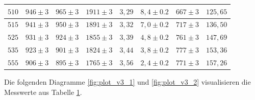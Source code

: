 \begin{table}[H]
\begin{tabular}{|l|l|l|l|l|l|l|l|}
                    \hline
                    $510$ & $946 \pm 3$ & $965 \pm 3$ & $1911 \pm 3$ & $3,29$ & $8,4 \pm 0.2$ & $667 \pm 3$ & $125,65$\\
                    \hline
                    $515$ & $941 \pm 3$ & $950 \pm 3$ & $1891 \pm 3$ & $3,32$ & $7,0 \pm 0.2$ & $717 \pm 3$ & $136,50$\\
                    \hline
                    $525$ & $931 \pm 3$ & $924 \pm 3$ & $1855 \pm 3$ & $3,39$ & $4,8 \pm 0.2$ & $761 \pm 3$ & $147,69$\\
                    \hline
                    $535$ & $923 \pm 3$ & $901 \pm 3$ & $1824 \pm 3$ & $3,44$ & $3,8 \pm 0.2$ & $777 \pm 3$ & $153,36$\\
                    \hline
                    $555$ & $906 \pm 3$ & $895 \pm 3$ & $1765 \pm 3$ & $3,56$ & $2,4 \pm 0.2$ & $771 \pm 3$ & $157,26$\\
                    \hline
                \end{tabular}
                \label{tab:ergebnisse_v3}
            \end{table}

            Die folgenden Diagramme \ref{fig:plot_v3_1} und \ref{fig:plot_v3_2} visualisieren die Messwerte aus Tabelle \ref{tab:ergebnisse_v3}.

